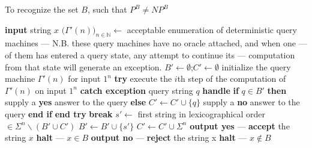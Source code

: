 \documentclass[letterpaper]{article}
\begin{document}
\begin{algorithm}
	\caption{To recognize the set $B$, such that $P^B\ne NP^B$}\label{algb}
	\begin{algorithmic}[5]
		\State \textbf{input} string $x$
		\State $\big(\Gamma'(n)\big)_{n\in\mathbb N}\gets$ acceptable enumeration of deterministic query machines
		\State\hspace{\algorithmicindent} --- N.B. these query machines have no oracle attached, and when one
		\State\hspace{\algorithmicindent}
		--- of them has entered a query state, any attempt to continue its
		\State\hspace{\algorithmicindent}
		--- computation from that state will generate an exception.
		\State $B'\gets\emptyset$;\quad $C'\gets\emptyset$
		\State initialize the query machine $\Gamma'(n)$ for input $1^n$
		\State \textbf{try} \label{algtrybegin}
		\State\hspace{\algorithmicindent} execute the $i$th step of the computation of $\Gamma'(n)$ on input $1^n$
		\State \textbf{catch exception} query string $q$ \textbf{handle}	
		\State\hspace{\algorithmicindent}\textbf{if} {$q\in B'$} \textbf{then}
		\State\hspace{\algorithmicindent}\hspace{\algorithmicindent} supply a \textbf{yes} answer to the query
		\State\hspace{\algorithmicindent}\textbf{else}
		\State\hspace{\algorithmicindent}\hspace{\algorithmicindent} $C'\gets C'\cup\{q\}$
		\State\hspace{\algorithmicindent}\hspace{\algorithmicindent} supply a \textbf{no} answer to the query
		\State\hspace{\algorithmicindent}\textbf{end if}
		\State \textbf{end try}\label{algtryend}
		\State \textbf{break}
		\EndIf
		\EndFor
		\State $s'\gets$ first string in lexicographical order	$\in\Sigma^n\operatorname\backslash(B'\cup C')$
		\State $B'\gets B'\cup\{s'\}$
		\Else
		\State $C'\gets C'\cup \Sigma^n$
		\EndIf
		\State \textbf{output yes} --- \textbf{accept} the string $x$
		\State \textbf{halt} --- $x\in B$
		\State \textbf{output no} --- \textbf{reject} the string x
		\State \textbf{halt} --- $x\notin B$
		\EndIf
		\EndFor
	\end{algorithmic}
\end{algorithm}
\end{document}

